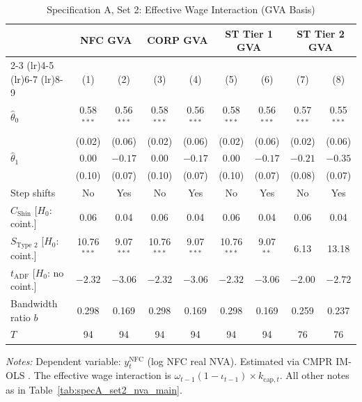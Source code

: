 \begin{table}[htbp]
	\centering
	\caption{Specification A, Set 2: Effective Wage Interaction (GVA Basis)}
	\label{tab:specA_set2_gva_app}
	\small
	\begin{tabular}{@{}lcccccccc@{}}
		\toprule
		& \multicolumn{2}{c}{NFC GVA} & \multicolumn{2}{c}{CORP GVA} & \multicolumn{2}{c}{ST Tier 1 GVA} & \multicolumn{2}{c}{ST Tier 2 GVA} \\
		\cmidrule(lr){2-3} \cmidrule(lr){4-5} \cmidrule(lr){6-7} \cmidrule(lr){8-9}
		& (1) & (2) & (3) & (4) & (5) & (6) & (7) & (8) \\
		\midrule
		$\hat{\theta}_0$ & 0.58$^{***}$ & 0.56$^{***}$ & 0.58$^{***}$ & 0.56$^{***}$ & 0.58$^{***}$ & 0.56$^{***}$ & 0.57$^{***}$ & 0.55$^{***}$ \\
		& (0.02) & (0.06) & (0.02) & (0.06) & (0.02) & (0.06) & (0.02) & (0.06) \\
		$\hat{\theta}_1$ & 0.00 & $-0.17$ & 0.00 & $-0.17$ & 0.00 & $-0.17$ & $-0.21$ & $-0.35$ \\
		& (0.10) & (0.07) & (0.10) & (0.07) & (0.10) & (0.07) & (0.08) & (0.07) \\
		\midrule
		Step shifts & No & Yes & No & Yes & No & Yes & No & Yes \\
		$C_{\text{Shin}}$ [$H_0$: coint.] & 0.06 & 0.04 & 0.06 & 0.04 & 0.06 & 0.04 & 0.06 & 0.04 \\
		$S_{\text{Type 2}}$ [$H_0$: coint.] & 10.76$^{***}$ & 9.07$^{***}$ & 10.76$^{***}$ & 9.07$^{***}$ & 10.76$^{***}$ & 9.07$^{**}$ & 6.13 & 13.18 \\
		$t_{\text{ADF}}$ [$H_0$: no coint.] & $-2.32$ & $-3.06$ & $-2.32$ & $-3.06$ & $-2.32$ & $-3.06$ & $-2.00$ & $-2.72$ \\
		Bandwidth ratio $b$ & 0.298 & 0.169 & 0.298 & 0.169 & 0.298 & 0.169 & 0.259 & 0.237 \\
		$T$ & 94 & 94 & 94 & 94 & 94 & 94 & 76 & 76 \\
		\bottomrule
	\end{tabular}
	\begin{minipage}{\textwidth}
		\scriptsize
		\textit{Notes:} Dependent variable: $y_t^{\text{NFC}}$ (log NFC real NVA). Estimated via CMPR IM-OLS \citep{VogelsangWagner2024}. The effective wage interaction is $\omega_{t-1}(1-\iota_{t-1}) \times k_{\text{cap},t}$. All other notes as in Table~\ref{tab:specA_set2_nva_main}.
	\end{minipage}
\end{table}

